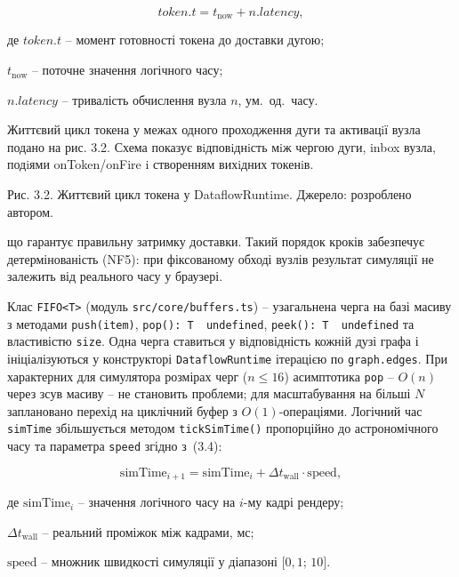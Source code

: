\documentclass[
]{article}
\begin{document}
\begin{equation}
\tag{3.3}\label{eq:token-emit-time}
token.t = t_{\text{now}} + n.latency,
\end{equation}

де \(token.t\) -- момент готовності токена до доставки дугою;

\(t_{\text{now}}\) -- поточне значення логічного часу;

\(n.latency\) -- тривалість обчислення вузла \(n\), ум.~од.~часу.

Життєвий цикл токена у межах одного проходження дуги та активацiї вузла
подано на рис. 3.2. Схема показує вiдповiднiсть мiж чергою дуги, inbox
вузла, подiями onToken/onFire i створенням вихiдних токенiв.

Рис. 3.2. Життєвий цикл токена у DataflowRuntime. Джерело: розроблено
автором.

що гарантує правильну затримку доставки. Такий порядок кроків забезпечує
детермінованість (NF5): при фіксованому обході вузлів результат
симуляції не залежить від реального часу у браузері.

Клас \texttt{FIFO\textless{}T\textgreater{}} (модуль
\texttt{src}\texttt{/}\texttt{core}\texttt{/}\texttt{buffers.ts}) --
узагальнена черга на базі масиву з методами
\texttt{push}\texttt{(}\texttt{item}\texttt{)},
\texttt{pop}\texttt{():\ T\ \textbar{}\ }\texttt{undefined},
\texttt{peek}\texttt{():\ T\ \textbar{}\ }\texttt{undefined} та
властивістю \texttt{size}. Одна черга ставиться у відповідність кожній
дузі графа і ініціалізуються у конструкторі \texttt{DataflowRuntime}
ітерацією по \texttt{graph.edges}. При характерних для симулятора
розмірах черг (\(n \leq 16\)) асимптотика \texttt{pop} -- \(O(n)\) через
зсув масиву -- не становить проблеми; для масштабування на більші \(N\)
заплановано перехід на циклічний буфер з \(O(1)\)-операціями. Логічний
час \texttt{simTime} збільшується методом
\texttt{tickSimTime}\texttt{()} пропорційно до астрономічного часу та
параметра \texttt{speed} згідно з~(3.4):

\begin{equation}
\tag{3.4}\label{eq:simtime-update}
\text{simTime}_{i + 1} = \text{simTime}_{i} + \Delta t_{\text{wall}} \cdot \text{speed},
\end{equation}

де \(\text{simTime}_{i}\) -- значення логічного часу на \(i\)-му кадрі рендеру;

\(\Delta t_{\text{wall}}\) -- реальний проміжок між кадрами, мс;

\(\text{speed}\) -- множник швидкості симуляції у діапазоні \(\lbrack 0{,}1;\, 10\rbrack\).
\end{document}
